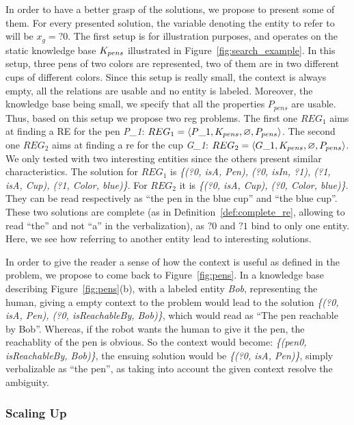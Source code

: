 \documentclass[a4paper,11pt,twoside]{StyleThese}
\begin{document}
In order to have a better grasp of the solutions, we propose to present some of them. For every presented solution, the variable denoting the entity to refer to will be $x_g = ?0$.
The first setup is for illustration purposes, and operates on the static knowledge base $K_{pens}$ illustrated in Figure~\ref{fig:search_example}. In this setup, three pens of two colors are represented, two of them are in two different cups of different colors.
Since this setup is really small, the context is always empty, all the relations are usable and no entity is labeled. Moreover, the knowledge base being small, we specify that all the properties $P_{pens}$ are usable.
Thus, based on this setup we propose two \acrshort{reg} problems. The first one $REG_1$ aims at finding a RE for the pen \textit{P\_1}: $REG_1 = \langle P\_1, K_{pens}, \varnothing, P_{pens} \rangle$. The second one $REG_2$ aims at finding a \acrshort{re} for the cup \textit{G\_1}: $REG_2 = \langle G\_1, K_{pens}, \varnothing, P_{pens} \rangle$.
We only tested with two interesting entities since the others present similar characteristics.
The solution for $REG_1$ is \textit{\{(?0, isA, Pen), (?0, isIn, ?1), (?1, isA, Cup), (?1, Color, blue)\}}. For $REG_2$ it is \textit{\{(?0, isA, Cup), (?0, Color, blue)\}}. They can be read respectively as ``the pen in the blue cup'' and ``the blue cup''. These two solutions are complete (as in Definition~\ref{def:complete_re}, allowing to read ``the'' and not ``a'' in the verbalization), as $?0$ and $?1$ bind to only one entity. Here, we see how referring to another entity lead to interesting solutions.

In order to give the reader a sense of how the context is useful as defined in the problem, we propose to come back to Figure~\ref{fig:pens}.
In a knowledge base describing Figure~\ref{fig:pens}(b), with a labeled entity \textit{Bob}, representing the human, giving a empty context to the problem would lead to the solution \textit{\{(?0, isA, Pen), (?0, isReachableBy, Bob)\}}, which would read as ``The pen reachable by Bob''. Whereas, if the robot wants the human to give it the pen, the reachablity of the pen is obvious. So the context would become: \textit{\{(pen0, isReachableBy, Bob)\}}, the ensuing solution would be \textit{\{(?0, isA, Pen)\}}, simply verbalizable as ``the pen'', as taking into account the given context resolve the ambiguity.

\subsubsection{Scaling Up}
\end{document}

